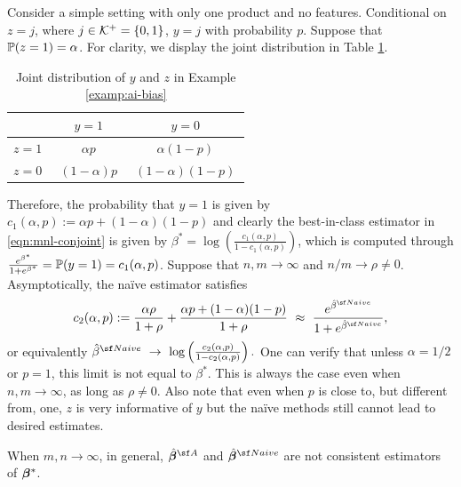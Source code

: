 \begin{examp}
\label{examp:ai-bias}
{\rm 
Consider a simple setting with 
only one product and no features.
Conditional on $z = j$, where $j \in \mathcal{K}^+ = \{0,1\}$, $y = j$ with probability $p$.
Suppose that $\mathbb{P}(z = 1) = \alpha$. 
For clarity, we display the joint distribution in Table \ref{tab:joint-y-z}.

\begin{table}
\renewcommand{\arraystretch}{1.5}
\centering
{\footnotesize
\caption{Joint distribution of $y$ and $z$ in Example \ref{examp:ai-bias}}
\label{tab:joint-y-z}
\begin{tabular}{  c |c  c }
\hline
\hline
  & $y=1$ & $y=0$ \\ \hline
 $z=1~$ & $~\alpha p~$ & $~\alpha (1-p)~$ \\  \hline
 $z=0~$ & $~(1-\alpha) p~$ & $~(1-\alpha) (1-p)~$
 \\\hline\hline
\end{tabular}
}
\end{table}


Therefore, the probability that $y = 1$ is given by $c_1(\alpha, p):=\alpha p +(1 - \alpha)(1 - p)$ and clearly the best-in-class estimator in \eqref{eqn:mnl-conjoint} is given by $\beta^* = \log\left(\frac{c_1(\alpha, p)}{1- c_1(\alpha, p)}\right)$, which is computed through
$
\frac{e^{\beta^*}}{1 + e^{\beta^*}} = \mathbb{P}(y = 1) = c_1(\alpha, p)
$.
Suppose that $n, m \rightarrow \infty$ and $n/m \rightarrow \rho \neq 0$. 
Asymptotically, the na\"ive estimator satisfies 
$$
c_2(\alpha, p):=\frac{\alpha \rho}{1 + \rho}+ 
\frac{\alpha p +(1 - \alpha)(1 - p)}{1 + \rho}~\approx~\frac{e^{\hat{\beta}^{\sf Naive}}}{1 + e^{\hat{\beta}^{\sf Naive}}},
$$
or equivalently 
$
\hat{\beta}^{\sf Naive}~\rightarrow~ \log\left(
\frac{c_2(\alpha, p)}{1-c_2(\alpha, p)}
\right).
$
One can verify that unless $\alpha = 1/2$ or $p = 1$,  this limit is not equal to $\beta^*$. 
This is always the case even when $n,m\rightarrow \infty$, as long as $\rho \neq 0$. 
Also note that even when $p$ is close to, but different from, one, $z$ is very informative of $y$ but the na\"ive methods still cannot lead to desired estimates. }
\end{examp}


\begin{prop}
\label{prop:bias}
When $m, n \rightarrow \infty$, in general, 
    $\hat{\betavec}^{\sf A}$ and $\hat{\betavec}^{\sf Naive}$ are not consistent estimators of ${\bm{\beta}}^*$.
\end{prop}






